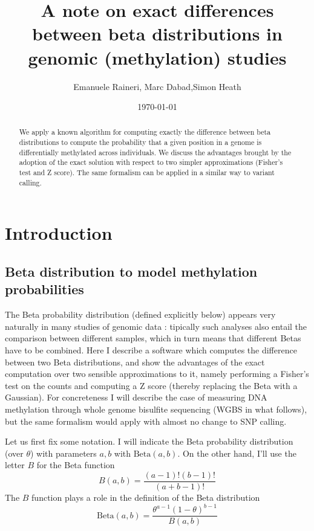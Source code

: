 \documentclass[11pt]{amsart}
\title{A note on exact differences between beta distributions in genomic (methylation) studies}
\author{Emanuele Raineri, Marc Dabad,Simon Heath}
\date{\today}
\begin{document}
\begin{abstract}
We apply a known algorithm for computing exactly the difference between beta distributions
to compute the probability that a given position in a genome is differentially methylated across
individuals. We discuss the advantages brought by the adoption of the exact solution
with respect to two simpler approximations (Fisher's test and Z score).
The same formalism can be applied in a similar way to variant calling.
\end{abstract}
\maketitle
\section{Introduction}
\subsection{Beta distribution to model methylation probabilities}
The Beta probability distribution (defined explicitly below)  appears very naturally in many studies of genomic data : tipically such analyses also entail the comparison between different samples, which in turn means that different Betas have to be combined. Here I describe a software which computes the difference between two Beta distributions, and show the advantages of the exact computation over two sensible approximations to it, namely performing a Fisher's test on the counts and computing a Z score (thereby replacing the Beta with a Gaussian). For concreteness I will describe the case of measuring DNA methylation through whole genome bisulfite sequencing (WGBS in what follows), but the same formalism would apply with almost no change to SNP calling. 

Let us first fix some notation. I will indicate the Beta probability distribution (over $\theta$) with parameters $a,b$ with $\mbox{Beta}(a,b)$. On the other hand, I'll use the letter $B$ for the Beta function 
\[B(a,b)=\frac{(a-1)!(b-1)!}{(a+b-1)!}\] The $B$ function plays a role in the definition of the Beta distribution \[\mbox{Beta}(a,b)=\frac{\theta^{a-1}(1-\theta)^{b-1}}{B(a,b)}\]
 
\end{document}
